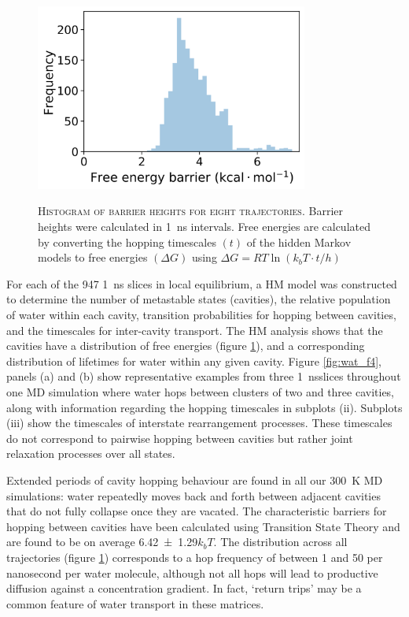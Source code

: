 \begin{figure}
    \centering
    \caption[Histogram of barrier heights for eight trajectories]{\textsc{Histogram of barrier heights for eight trajectories}. Barrier heights were calculated in \SI{1}{\nano\second} intervals. Free energies are calculated by converting the hopping timescales $(t)$ of the hidden Markov models to free energies $(\Delta G)$ using $\Delta G=R T \ln \left(k_{b} T \cdot t / h\right)$}
    \includegraphics[width=0.8\textwidth]{chapters/water_hopping/figures/Fig_S10.png}
    \label{fig:wat_s9}
\end{figure}

For each of the \num{947} \SI{1}{\nano\second} slices in local equilibrium, a HM model was constructed to determine the number of metastable states (cavities), the relative population of water within each cavity, transition probabilities for hopping between cavities, and the timescales for inter-cavity transport. The HM analysis shows that the cavities have a distribution of free energies (figure \ref{fig:wat_s9}), and a corresponding distribution of lifetimes for water within any given cavity. Figure \ref{fig:wat_f4}, panels (a) and (b) show representative examples from three \SI{1}{\nano\second}slices throughout one MD simulation where water hops between clusters of two and three cavities, along with information regarding the hopping timescales in subplots (ii). Subplots (iii) show the timescales of interstate rearrangement processes. These timescales do not correspond to pairwise hopping between cavities but rather joint relaxation processes over all states.

Extended periods of cavity hopping behaviour are found in all our \SI{300}{\kelvin} MD simulations: water repeatedly moves back and forth between adjacent cavities that do not fully collapse once they are vacated. The characteristic barriers for hopping between cavities have been calculated using Transition State Theory and are found to be on average \num{6.42\pm1.29}$k_{b}T$. The distribution across all trajectories (figure \ref{fig:wat_s9}) corresponds to a hop frequency of between \num{1} and \num{50} per nanosecond per water molecule, although not all hops will lead to productive diffusion against a concentration gradient. In fact, `return trips’ may be a common feature of water transport in these matrices.

